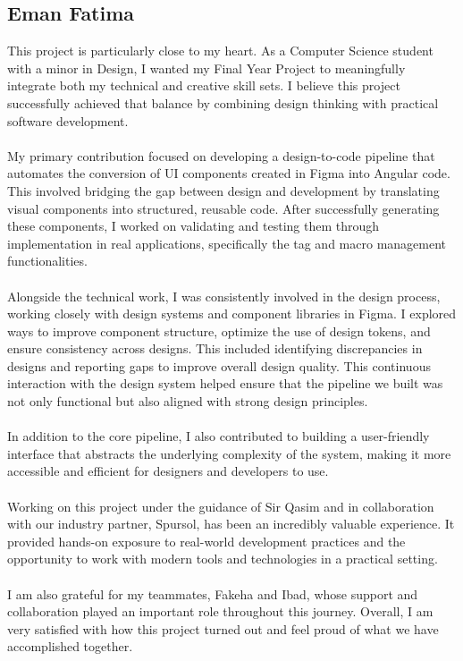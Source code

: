\subsection{Eman Fatima}
This project is particularly close to my heart. As a Computer Science student with a minor in Design, I wanted my Final Year Project to meaningfully integrate both my technical and creative skill sets. I believe this project successfully achieved that balance by combining design thinking with practical software development.
\\\\
My primary contribution focused on developing a design-to-code pipeline that automates the conversion of UI components created in Figma into Angular code. This involved bridging the gap between design and development by translating visual components into structured, reusable code. After successfully generating these components, I worked on validating and testing them through implementation in real applications, specifically the tag and macro management functionalities.
\\\\
Alongside the technical work, I was consistently involved in the design process, working closely with design systems and component libraries in Figma. I explored ways to improve component structure, optimize the use of design tokens, and ensure consistency across designs. This included identifying discrepancies in designs and reporting gaps to improve overall design quality. This continuous interaction with the design system helped ensure that the pipeline we built was not only functional but also aligned with strong design principles.
\\\\
In addition to the core pipeline, I also contributed to building a user-friendly interface that abstracts the underlying complexity of the system, making it more accessible and efficient for designers and developers to use.
\\\\
Working on this project under the guidance of Sir Qasim and in collaboration with our industry partner, Spursol, has been an incredibly valuable experience. It provided hands-on exposure to real-world development practices and the opportunity to work with modern tools and technologies in a practical setting.
\\\\
I am also grateful for my teammates, Fakeha and Ibad, whose support and collaboration played an important role throughout this journey.
Overall, I am very satisfied with how this project turned out and feel proud of what we have accomplished together.

